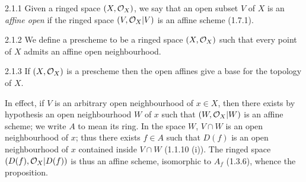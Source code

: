 \documentclass[../main.tex]{subfiles}
\begin{document}
\begin{cx}{2.1.1}
    Given a ringed space $(X,\mathcal{O}_X)$, we say that an open subset $V$ of $X$ is an \emph{affine open} if the ringed space $(V,\mathcal{O}_X|V)$ is an affine scheme (1.7.1).
\end{cx}

\begin{cx}[Definition]{2.1.2}
    We define a prescheme to be a ringed space $(X,\mathcal{O}_X)$ such that every point of $X$ admits an affine open neighbourhood.
\end{cx}

\begin{cx}[Proposition]{2.1.3}
    If $(X,\mathcal{O}_X)$ is a prescheme then the open affines give a base for the topology of $X$.
\end{cx}

In effect, if $V$ is an arbitrary open neighbourhood of $x\in X$, then there exists by hypothesis an open neighbourhood $W$ of $x$ such that $(W,\mathcal{O}_X|W)$ is an affine scheme; we write $A$ to mean its ring.
In the space $W$, $V\cap W$ is an open neighbourhood of $x$; thus there exists $f\in A$ such that $D(f)$ is an open neighbourhood of $x$ contained inside $V\cap W$ (1.1.10 (i)).
The ringed space $(D(f),\mathcal{O}_X|D(f))$ is thus an affine scheme, isomorphic to $A_f$ (1.3.6), whence the proposition.
\end{document}
